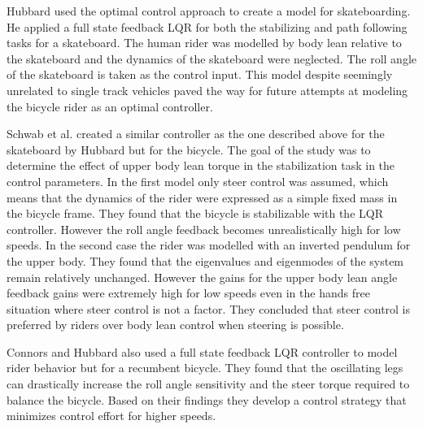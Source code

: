 Hubbard \cite{hubbard1979lateral} used the optimal control approach to create a model for skateboarding. He applied a full state feedback LQR for both the stabilizing and path following tasks for a skateboard. The human rider was modelled by body lean relative to the skateboard and the dynamics of the skateboard were neglected. The roll angle of the skateboard is taken as the control input. This model despite seemingly unrelated to single track vehicles paved the way for future attempts at modeling the bicycle rider as an optimal controller.
\par
Schwab et al.\cite{schwab2008some} created a similar controller as the one described above for the skateboard by Hubbard  but for the bicycle. The goal of the study was to determine the effect of upper body lean torque in the stabilization task in the control parameters. In the first model only steer control was assumed, which means that the dynamics of the rider were expressed as a simple fixed mass in the bicycle frame. They found that the bicycle is stabilizable with the LQR controller. However the roll angle feedback becomes unrealistically high for low speeds. In the second case the rider was modelled with an inverted pendulum for the upper body. They found that the eigenvalues and eigenmodes of the system remain relatively unchanged. However the gains for the upper body lean angle feedback gains were extremely high for low speeds even in the hands free situation where steer control is not a factor. They concluded that steer control is preferred by riders over body lean control when steering is possible.
\par
Connors and Hubbard \cite{connors2008modelling} also used a full state feedback LQR controller to model rider behavior but for a recumbent bicycle. They found that the oscillating legs can drastically increase the roll angle sensitivity and the steer torque required to balance the bicycle. Based on their findings they develop a control strategy that minimizes control effort for higher speeds.

